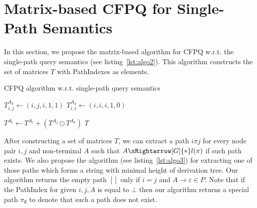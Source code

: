 \section{Matrix-based CFPQ for Single-Path Semantics}
In this section, we propose the matrix-based algorithm for CFPQ w.r.t. the single-path query semantics (see listing~\ref{lst:algo2}). This algorithm constructs the set of matrices $T$ with PathIndexes as elements.
{\small
	\begin{algorithm}
		\begin{algorithmic}[1]
			\caption{CFPQ algorithm w.r.t. single-path query semantics}
			\label{lst:algo2}
			{$T^{A_k}_{i,j} \gets (i,j,i,1,1)$}
			\EndFor
			{$T^{A_k}_{i,i} \gets (i,i,i,1,0)$}
			\EndFor
			
			{ $T^{A_i} \gets T^{A_i} + (T^{A_j} \odot T^{A_k})$ } 
			\EndFor
			\EndWhile
			\State \Return $T$
			\EndFunction
		\end{algorithmic}
	\end{algorithm}
}

After constructing a set of matrices $T$, we can extract a path $i \pi j$ for every node pair $i, j$ and non-terminal $A$ such that $A \xRightarrow[G]{*} l(\pi)$ if such path exists. We also propose the algorithm (see listing~\ref{lst:algo3}) for extracting one of those paths which forms a string with minimal height of derivation tree. Our algorithm returns the empty path $[]$ only if $i = j$ and $A \to \varepsilon \in P$. Note that if the PathIndex for given $i,j,A$ is equal to $\bot$ then our algorithm returns a special path $\pi_{\emptyset}$ to denote that such a path does not exist.

